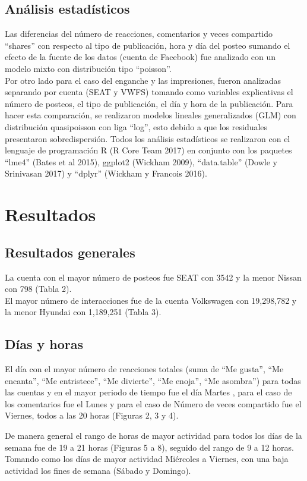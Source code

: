 \documentclass[a4paper,10pt]{article}
\begin{document}
\subsection{Análisis estadísticos}
Las diferencias del número de reacciones, comentarios y veces compartido ``shares'' 
con respecto al tipo de publicación, hora y día del posteo sumando el efecto de
la fuente de los datos (cuenta de Facebook) fue analizado con un modelo mixto 
con distribución tipo ``poisson''.\\
Por otro lado para el caso del enganche y las impresiones, fueron 
analizadas separando por cuenta (SEAT y VWFS) tomando como variables
explicativas el número de posteos, el tipo de publicación, el día y hora de 
la publicación. Para hacer esta comparación, se realizaron modelos lineales generalizados (GLM)
con distribución quasipoisson con liga ``log'', esto debido a que los residuales 
presentaron sobredispersión.
Todos los análisis estadísticos se realizaron con el lenguaje de programación
R (R Core Team 2017) en conjunto con los paquetes ``lme4'' (Bates et al 2015), 
ggplot2 (Wickham 2009), ``data.table'' (Dowle y Srinivasan 2017) y 
``dplyr'' (Wickham y Francois 2016). 



\section{Resultados}
\subsection{Resultados generales}
La cuenta con el mayor número de posteos fue SEAT con 3542 y la menor Nissan con 798 (Tabla 2).\\
El mayor número de interacciones fue de la cuenta Volkswagen con 19,298,782 y la 
menor Hyundai con  1,189,251 (Tabla 3).


\subsection{Días y horas}
El día con el mayor número de reacciones totales (suma de ``Me gusta'', 
``Me encanta'', ``Me entristece'', ``Me divierte'', ``Me enoja'', ``Me asombra'')
para todas las cuentas y en el mayor periodo de tiempo fue el día Martes ,
para el caso de los comentarios fue el Lunes y para el caso
de Número de veces compartido fue el Viernes, todos a las 20 horas (Figuras 2, 3 y 4).

De manera general el rango de horas de mayor actividad para todos los días
de la semana fue de 19 a 21 horas (Figuras 5 a 8), seguido del rango de 9 
a 12 horas. Tomando como los días de mayor actividad Miércoles a Viernes, 
con una baja actividad los fines de semana (Sábado y Domingo). 
\end{document}
